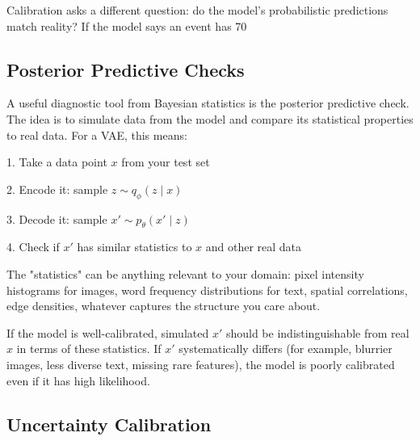 \vspace{0.3cm}

Calibration asks a different question: do the model's probabilistic predictions match reality? If the model says an event has 70%

\vspace{1.5em}

\subsection{Posterior Predictive Checks}

A useful diagnostic tool from Bayesian statistics is the posterior predictive check. The idea is to simulate data from the model and compare its statistical properties to real data. For a VAE, this means:

\vspace{0.3cm}

1. Take a data point $x$ from your test set

2. Encode it: sample $z \sim q_\phi(z \mid x)$

3. Decode it: sample $x' \sim p_\theta(x' \mid z)$

4. Check if $x'$ has similar statistics to $x$ and other real data

\vspace{0.3cm}

The "statistics" can be anything relevant to your domain: pixel intensity histograms for images, word frequency distributions for text, spatial correlations, edge densities, whatever captures the structure you care about.

\vspace{0.3cm}

If the model is well-calibrated, simulated $x'$ should be indistinguishable from real $x$ in terms of these statistics. If $x'$ systematically differs (for example, blurrier images, less diverse text, missing rare features), the model is poorly calibrated even if it has high likelihood.

\vspace{1.5em}

\subsection{Uncertainty Calibration}

